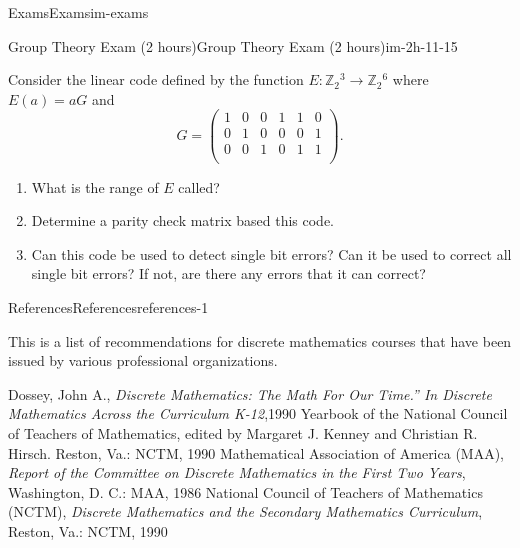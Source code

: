 \documentclass[oneside,10pt,]{book}
\begin{document}
\begin{chapterptx}{Exams}{}{Exams}{}{}{im-exams}
\begin{sectionptx}{Group Theory Exam (2 hours)}{}{Group Theory Exam (2 hours)}{}{}{im-2h-11-15}
\begin{enumerate}
Consider the linear code defined by the function \(E:\mathbb{Z}_2{}^3\to \mathbb{Z}_2{}^6\) where \(E(a)= a G\) and%
\begin{equation*}
G=\left(
\begin{array}{cccccc}
1 & 0 & 0 & 1 & 1 & 0 \\
0 & 1 & 0 & 0 & 0 & 1 \\
0 & 0 & 1 & 0 & 1 & 1 \\
\end{array}
\right)\text{.}
\end{equation*}
%
\begin{enumerate}
\item\hypertarget{li-55}{}\hypertarget{p-81}{}%
What is the range of \(E\) called?%
\item\hypertarget{li-56}{}\hypertarget{p-82}{}%
Determine a parity check matrix based this code.%
\item\hypertarget{li-57}{}\hypertarget{p-83}{}%
Can this code be used to detect single bit errors? Can it be used to correct all single bit errors? If not, are there any errors that it can correct?%
\end{enumerate}
%
\end{enumerate}
%
\end{sectionptx}
\end{chapterptx}
%
\backmatter
%
%
%
%
%
\typeout{************************************************}
\typeout{************************************************}
%
\begin{references-chapter-numberless}{References}{}{References}{}{}{references-1}
\begin{introduction}{}%
\hypertarget{p-84}{}%
This is a list of recommendations for discrete mathematics courses that have been issued by various professional organizations.%
\end{introduction}%
\begin{referencelist}
\hypertarget{im-biblio-dossey-1990}{}Dossey, John A., \textit{Discrete Mathematics: The Math For Our Time.” In Discrete Mathematics Across the Curriculum K-12},1990 Yearbook of the National Council of Teachers of Mathematics, edited by Margaret J. Kenney and Christian R. Hirsch. Reston, Va.: NCTM, 1990
\hypertarget{im-biblio-maa-1986}{}Mathematical Association of America (MAA), \textit{Report of the Committee on Discrete Mathematics in the First Two Years}, Washington, D. C.: MAA, 1986
\hypertarget{im-biblio-nctm-1990}{}National Council of Teachers of Mathematics (NCTM), \textit{Discrete Mathematics and the Secondary Mathematics Curriculum}, Reston, Va.: NCTM, 1990
\end{referencelist}
\end{references-chapter-numberless}
\end{document}

